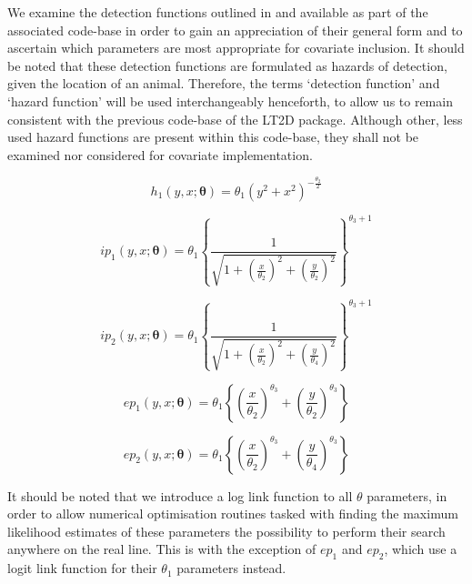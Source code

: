 \documentclass[11pt]{article}
\begin{document}
\begin{multicols}{2}
We examine the detection functions outlined in \cite{Borchers} and available as part of the associated code-base in order to gain an appreciation of their general form and to ascertain which parameters are most appropriate for covariate inclusion. It should be noted that these detection functions are formulated as hazards of detection, given the location of an animal. Therefore, the terms `detection function' and `hazard function' will be used interchangeably henceforth, to allow us to remain consistent with the previous code-base of the LT2D package. Although other, less used hazard functions are present within this code-base, they shall not be examined nor considered for covariate implementation.

\begingroup
\large

\begin{equation}
h_1\left(y,x;\boldsymbol{\theta}\right) = \theta_1\left(y^2+x^2\right)^{-\frac{\theta_2}{2}}
\end{equation}

\begin{equation}
ip_1\left(y,x;\boldsymbol{\theta}\right) = \theta_1\left\{\frac{1}{\sqrt{1+\left(\frac{x}{\theta_2}\right)^2+\left(\frac{y}{\theta_2}\right)^2}}\right\}^{\theta_3 + 1}
\end{equation}

\begin{equation}
ip_2\left(y,x;\boldsymbol{\theta}\right) = \theta_1\left\{\frac{1}{\sqrt{1+\left(\frac{x}{\theta_2}\right)^2+\left(\frac{y}{\theta_4}\right)^2}}\right\}^{\theta_3 + 1}
\end{equation}


\begin{equation}
ep_1\left(y,x;\boldsymbol{\theta}\right) = \theta_1\left\{\left(\frac{x}{\theta_2}\right)^{\theta_3}+\left(\frac{y}{\theta_2}\right)^{\theta_3}\right\}
\end{equation}

\begin{equation}
ep_2\left(y,x;\boldsymbol{\theta}\right) = \theta_1\left\{\left(\frac{x}{\theta_2}\right)^{\theta_3}+\left(\frac{y}{\theta_4}\right)^{\theta_3}\right\}
\end{equation}
\endgroup

It should be noted that we introduce a log link function to all $\theta$ parameters, in order to allow numerical optimisation routines tasked with finding the maximum likelihood estimates of these parameters the possibility to perform their search anywhere on the real line. This is with the exception of $ep_1$ and $ep_2$, which use a logit link function for their $\theta_1$ parameters instead.


\end{multicols}
\end{document}
